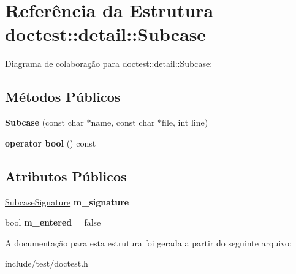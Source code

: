 \hypertarget{structdoctest_1_1detail_1_1Subcase}{}\section{Referência da Estrutura doctest\+:\+:detail\+:\+:Subcase}
\label{structdoctest_1_1detail_1_1Subcase}


Diagrama de colaboração para doctest\+:\+:detail\+:\+:Subcase\+:
\subsection*{Métodos Públicos}
\begin{DoxyCompactItemize}
\item 
\mbox{\label{structdoctest_1_1detail_1_1Subcase_a1a2b0136a3799e2344709840260a3277}} 
{\bfseries Subcase} (const char $\ast$name, const char $\ast$file, int line)
\item 
\mbox{\label{structdoctest_1_1detail_1_1Subcase_a91a520769fc55fb5be781f949ef3200f}} 
{\bfseries operator bool} () const
\end{DoxyCompactItemize}
\subsection*{Atributos Públicos}
\begin{DoxyCompactItemize}
\item 
\mbox{\label{structdoctest_1_1detail_1_1Subcase_a54730e9b88cf33ea4a5c873164029202}} 
\hyperlink{structdoctest_1_1SubcaseSignature}{Subcase\+Signature} {\bfseries m\+\_\+signature}
\item 
\mbox{\label{structdoctest_1_1detail_1_1Subcase_acb703ee6e769f56fba4053447c1a36e4}} 
bool {\bfseries m\+\_\+entered} = false
\end{DoxyCompactItemize}


A documentação para esta estrutura foi gerada a partir do seguinte arquivo\+:\begin{DoxyCompactItemize}
\item 
include/test/doctest.\+h\end{DoxyCompactItemize}

